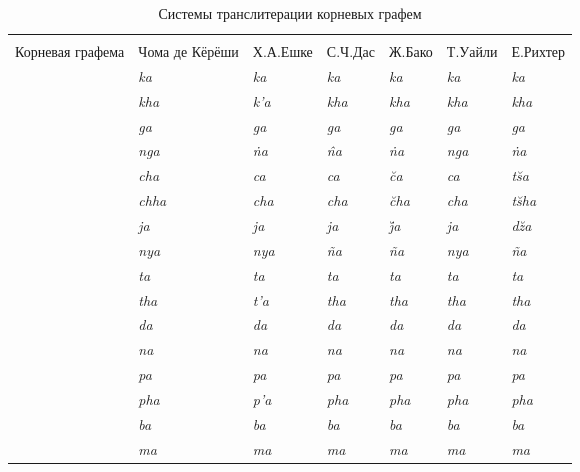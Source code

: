\begin{longtabu} to \linewidth {|X[1,c] | X[1,c] | X[1,c] |X[1,c] |X[1,c] |X[1,c] |X[1,c] |}
	\everyrow {\tabucline{-}}
	\caption{Системы транслитерации корневых графем}\label{tab:9}\\
	Корневая графема & Чома де Кёрёши & Х.А.Ешке & С.Ч.Дас & Ж.Бако & Т.Уайли & Е.Рихтер\\
	 & \textit{ka} & \textit{ka} & \textit{ka} & \textit{ka} & \textit{ka} & \textit{ka}\\
	 & \textit{kha} & \textit{k'a} & \textit{kha} & \textit{kha} & \textit{kha} & \textit{kha}\\
	 & \textit{ga} & \textit{ga} & \textit{ga} & \textit{ga} & \textit{ga} & \textit{ga}\\
	 & \textit{nga} & \textit{\.{n}a} & \textit{\^{n}a} & \textit{\.{n}a} & \textit{nga} & \textit{\.{n}a}\\
	 & \textit{cha} & \textit{ca} & \textit{ca} & \textit{\u{c}a} & \textit{ca} & \textit{t\u{s}a}\\
	 & \textit{chha} & \textit{cha} & \textit{cha} & \textit{\u{c}ha} & \textit{cha} & \textit{t\u{s}ha}\\
	 & \textit{ja} & \textit{ja} & \textit{ja} & \textit{\u{j}a} & \textit{ja} & \textit{d\u{z}a}\\
	 & \textit{nya} & \textit{nya} & \textit{\~{n}a} & \textit{\~{n}a} & \textit{nya} & \textit{\~{n}a}\\
	 & \textit{ta} & \textit{ta} & \textit{ta} & \textit{ta} & \textit{ta} & \textit{ta}\\
	 & \textit{tha} & \textit{t'a} & \textit{tha} & \textit{tha} & \textit{tha} & \textit{tha}\\
	 & \textit{da} & \textit{da} & \textit{da} & \textit{da} & \textit{da} & \textit{da}\\
	 & \textit{na} & \textit{na} & \textit{na} & \textit{na} & \textit{na} & \textit{na}\\
	 & \textit{pa} & \textit{pa} & \textit{pa} & \textit{pa} & \textit{pa} & \textit{pa}\\
	 & \textit{pha} & \textit{p'a} & \textit{pha} & \textit{pha} & \textit{pha} & \textit{pha}\\
	 & \textit{ba} & \textit{ba} & \textit{ba} & \textit{ba} & \textit{ba} & \textit{ba}\\
	 & \textit{ma} & \textit{ma} & \textit{ma} & \textit{ma} & \textit{ma} & \textit{ma}\\

\end{longtabu}
